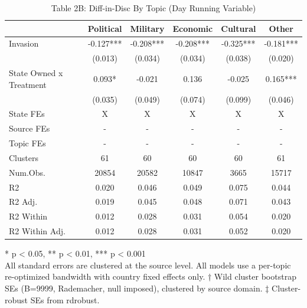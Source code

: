 \begin{table}[!t]
\caption{Table 2B: Diff-in-Disc By Topic (Day Running Variable)} 
\fontsize{12.0pt}{14.4pt}\selectfont
\begin{tabular*}{\linewidth}{@{\extracolsep{\fill}}lccccc}
\toprule
  & Political & Military & Economic & Cultural & Other \\ 
\midrule\addlinespace[2.5pt]
Invasion & -0.127*** & -0.208*** & -0.208*** & -0.325*** & -0.181*** \\ 
 & (0.013) & (0.034) & (0.034) & (0.038) & (0.020) \\ 
State Owned x Treatment & 0.093* & -0.021 & 0.136 & -0.025 & 0.165*** \\ 
{} & {(0.035)} & {(0.049)} & {(0.074)} & {(0.099)} & {(0.046)} \\ 
State FEs & X & X & X & X & X \\ 
Source FEs & - & - & - & - & - \\ 
Topic FEs & - & - & - & - & - \\ 
Clusters & 61 & 60 & 60 & 60 & 61 \\ 
Num.Obs. & 20854 & 20582 & 10847 & 3665 & 15717 \\ 
R2 & 0.020 & 0.046 & 0.049 & 0.075 & 0.044 \\ 
R2 Adj. & 0.019 & 0.045 & 0.048 & 0.071 & 0.043 \\ 
R2 Within & 0.012 & 0.028 & 0.031 & 0.054 & 0.020 \\ 
R2 Within Adj. & 0.012 & 0.028 & 0.031 & 0.052 & 0.020 \\ 
\bottomrule
\end{tabular*}
\begin{minipage}{\linewidth}
* p < 0.05, ** p < 0.01, *** p < 0.001\\
All standard errors are clustered at the source level. All models use a
per-topic re-optimized bandwidth with country fixed effects only. † Wild cluster
bootstrap SEs (B=9999, Rademacher, null imposed), clustered by source domain. ‡
Cluster-robust SEs from rdrobust.\\
\end{minipage}
\end{table}

